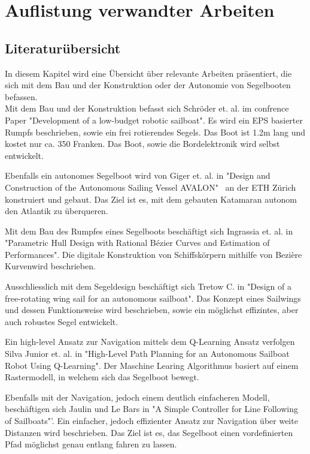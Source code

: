 

\chapter{Auflistung verwandter Arbeiten}
\label{chap:literaturübersicht}

\section{Literaturübersicht}
In diesem Kapitel wird eine Übersicht über relevante Arbeiten präsentiert, die sich mit dem Bau und der Konstruktion oder der Autonomie von Segelbooten befassen.
\\
Mit dem Bau und der Konstruktion befasst sich Schröder et. al. im confrence Paper "Development of a low-budget robotic sailboat". Es wird ein EPS basierter Rumpfs beschrieben, sowie ein frei rotierendes Segels. Das Boot ist 1.2m lang und kostet nur ca. 350 Franken. Das Boot, sowie die Bordelektronik wird selbst entwickelt. \cite{10.1007/978-3-319-02276-5_2}
 
Ebenfalls ein autonomes Segelboot wird von Giger et. al. in "Design and Construction of the Autonomous Sailing Vessel AVALON" \ an der ETH Zürich konstruiert und gebaut. Das Ziel ist es, mit dem gebauten Katamaran autonom den Atlantik zu überqueren. \cite{giger_design_2009}

Mit dem Bau des Rumpfes eines Segelboots beschäftigt sich Ingrassia et. al. in "Parametric Hull Design with Rational Bézier Curves and Estimation of Performances". Die digitale Konstruktion von Schiffskörpern  mithilfe von Bezière Kurvenwird  beschrieben. \cite{ingrassia_parametric_2021}

Ausschliesslich mit dem Segeldesign beschäftigt sich Tretow C. in "Design of a free-rotating wing sail for an autonomous sailboat". Das Konzept eines Sailwings und dessen Funktionsweise wird beschrieben, sowie ein möglichst effizintes, aber auch robustes Segel entwickelt. \cite{Tretow2017DesignOA}

Ein high-level Ansatz zur Navigation mittels dem Q-Learning Ansatz verfolgen Silva Junior et. al. in "High-Level Path Planning for an Autonomous Sailboat Robot Using Q-Learning". Der Maschine Learing Algorithmus basiert auf einem Rastermodell, in welchem sich das Segelboot bewegt. \cite{silva_junior_high-level_2020}

Ebenfalls mit der Navigation, jedoch einem deutlich einfacheren Modell, beschäftigen sich Jaulin und Le Bars in "{}A{} Simple Controller for Line Following of Sailboats"'. Ein einfacher, jedoch effizienter Ansatz zur Navigation über weite Distanzen wird beschrieben. Das Ziel ist es, das Segelboot einen vordefinierten Pfad möglichst genau entlang fahren zu lassen. \cite{sauze_simple_2013}

